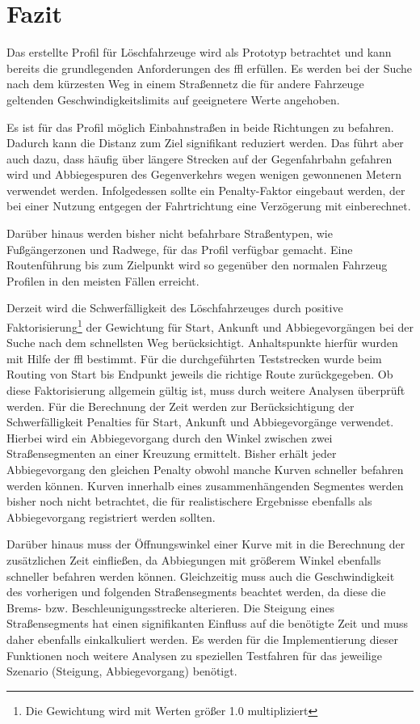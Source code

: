 \section{Fazit}

Das erstellte Profil für Löschfahrzeuge wird als Prototyp betrachtet und kann bereits die grundlegenden Anforderungen des \gls{ffl} erfüllen.
Es werden bei der Suche nach dem kürzesten Weg in einem Straßennetz die für andere Fahrzeuge geltenden Geschwindigkeitslimits auf geeignetere Werte angehoben.

Es ist für das Profil möglich Einbahnstraßen in beide Richtungen zu befahren.
Dadurch kann die Distanz zum Ziel signifikant reduziert werden.
Das führt aber auch dazu, dass häufig über längere Strecken auf der Gegenfahrbahn gefahren wird und Abbiegespuren des Gegenverkehrs wegen wenigen gewonnenen Metern verwendet werden.
Infolgedessen sollte ein Penalty-Faktor eingebaut werden, der bei einer Nutzung entgegen der Fahrtrichtung eine Verzögerung mit einberechnet.

Darüber hinaus werden bisher nicht befahrbare Straßentypen, wie Fußgängerzonen und Radwege, für das Profil verfügbar gemacht.
Eine Routenführung bis zum Zielpunkt wird so gegenüber den normalen Fahrzeug Profilen in den meisten Fällen erreicht.

Derzeit wird die Schwerfälligkeit des Löschfahrzeuges durch positive Faktorisierung\footnote{Die Gewichtung wird mit Werten größer 1.0 multipliziert} der Gewichtung für Start, Ankunft und Abbiegevorgängen bei der Suche nach dem schnellsten Weg berücksichtigt.
Anhaltspunkte hierfür wurden mit Hilfe der \gls{ffl} bestimmt.
Für die durchgeführten Teststrecken wurde beim Routing von Start bis Endpunkt jeweils die richtige Route zurückgegeben.
Ob diese Faktorisierung allgemein gültig ist, muss durch weitere Analysen überprüft werden.
Für die Berechnung der Zeit werden zur Berücksichtigung der Schwerfälligkeit Penalties für Start, Ankunft und Abbiegevorgänge verwendet.
Hierbei wird ein Abbiegevorgang durch den Winkel zwischen zwei Straßensegmenten an einer Kreuzung ermittelt.
Bisher erhält jeder Abbiegevorgang den gleichen Penalty obwohl manche Kurven schneller befahren werden können.
Kurven innerhalb eines zusammenhängenden Segmentes werden bisher noch nicht betrachtet, die für realistischere Ergebnisse ebenfalls als Abbiegevorgang registriert werden sollten.

Darüber hinaus muss der Öffnungswinkel einer Kurve mit in die Berechnung der zusätzlichen Zeit einfließen, da Abbiegungen mit größerem Winkel ebenfalls schneller befahren werden können.
Gleichzeitig muss auch die Geschwindigkeit des vorherigen und folgenden Straßensegments beachtet werden, da diese die Brems- bzw. Beschleunigungsstrecke alterieren.
Die Steigung eines Straßensegments hat einen signifikanten Einfluss auf die benötigte Zeit und muss daher ebenfalls einkalkuliert werden.
Es werden für die Implementierung dieser Funktionen noch weitere Analysen zu speziellen Testfahren für das jeweilige Szenario (Steigung, Abbiegevorgang) benötigt.

